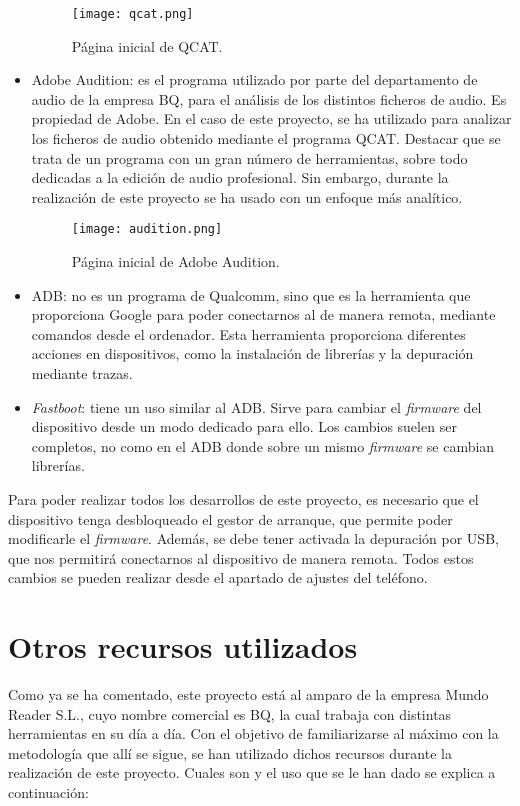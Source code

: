 \begin{itemize}
\begin{figure}[H]
		\centering
		\texttt{[image: qcat.png]}
		\caption{Página inicial de QCAT.}
		\label{fig:qcat}
	\end{figure}	
	\item{Adobe Audition: es el programa utilizado por parte del departamento de audio de la empresa BQ, para el análisis de los distintos ficheros de audio. Es propiedad de Adobe. En el caso de este proyecto, se ha utilizado para analizar los ficheros de audio obtenido mediante el programa \gls{QCAT}. Destacar que se trata de un programa con un gran número de herramientas, sobre todo dedicadas a la edición de audio profesional. Sin embargo, durante la realización de este proyecto se ha usado con un enfoque más analítico.}
	\begin{figure}[H]
		\centering
		\texttt{[image: audition.png]}
		\caption{Página inicial de Adobe Audition.}
		\label{fig:audition}
	\end{figure}	
	\item{\gls{ADB}: no es un programa de Qualcomm, sino que es la herramienta que proporciona Google para poder conectarnos al de manera remota, mediante comandos desde el ordenador. Esta herramienta proporciona diferentes acciones en dispositivos, como la instalación de librerías y la depuración mediante trazas.}
	\item{\textit{Fastboot}: tiene un uso similar al \gls{ADB}. Sirve para cambiar el \textit{firmware} del dispositivo desde un modo dedicado para ello. Los cambios suelen ser completos, no como en el \gls{ADB} donde sobre un mismo \textit{firmware} se cambian librerías.}
\end{itemize}

Para poder realizar todos los desarrollos de este proyecto, es necesario que el dispositivo tenga desbloqueado el gestor de arranque, que permite poder modificarle el \textit{firmware}. Además, se debe tener activada la depuración por \gls{USB}, que nos permitirá conectarnos al dispositivo de manera remota. Todos estos cambios se pueden realizar desde el apartado de ajustes del teléfono.

\break

\section{Otros recursos utilizados} \label{sec:otros_recursos}
Como ya se ha comentado, este proyecto está al amparo de la empresa Mundo Reader S.L., cuyo nombre comercial es BQ, la cual trabaja con distintas herramientas en su día a día. Con el objetivo de familiarizarse al máximo con la metodología que allí se sigue, se han utilizado dichos recursos durante la realización de este proyecto. Cuales son y el uso que se le han dado se explica a continuación:


